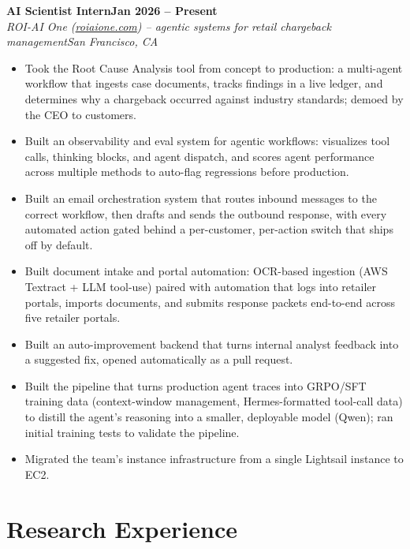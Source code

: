 \documentclass[10pt,letterpaper]{article}
\newcommand{\entry}[4]{%
  \par\textbf{#1}\hfill\textbf{#2}\\
  \textit{#3}\hfill\textit{#4}\par\vspace{1pt}}
\begin{document}
\entry{AI Scientist Intern}{Jan 2026 -- Present}
  {ROI-AI One (\href{https://roiaione.com/}{roiaione.com}) -- agentic systems for retail chargeback management}{San Francisco, CA}
\begin{itemize}
  \item Took the Root Cause Analysis tool from concept to production: a multi-agent workflow that ingests case documents, tracks findings in a live ledger, and determines why a chargeback occurred against industry standards; demoed by the CEO to customers.
  \item Built an observability and eval system for agentic workflows: visualizes tool calls, thinking blocks, and agent dispatch, and scores agent performance across multiple methods to auto-flag regressions before production.
  \item Built an email orchestration system that routes inbound messages to the correct workflow, then drafts and sends the outbound response, with every automated action gated behind a per-customer, per-action switch that ships off by default.
  \item Built document intake and portal automation: OCR-based ingestion (AWS Textract + LLM tool-use) paired with automation that logs into retailer portals, imports documents, and submits response packets end-to-end across five retailer portals.
  \item Built an auto-improvement backend that turns internal analyst feedback into a suggested fix, opened automatically as a pull request.
  \item Built the pipeline that turns production agent traces into GRPO/SFT training data (context-window management, Hermes-formatted tool-call data) to distill the agent's reasoning into a smaller, deployable model (Qwen); ran initial training tests to validate the pipeline.
  \item Migrated the team's instance infrastructure from a single Lightsail instance to EC2.
\end{itemize}

\section{Research Experience}
\end{document}
